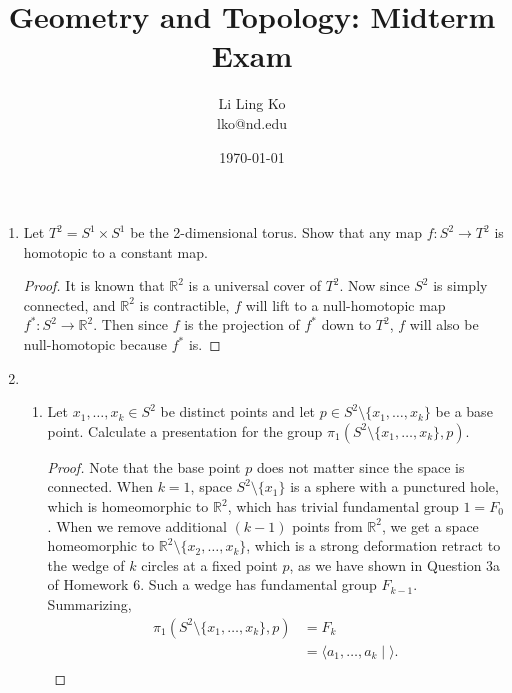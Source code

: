 \documentclass{article}
\begin{document}
\title{Geometry and Topology: Midterm Exam}
\author{Li Ling Ko\\ lko@nd.edu}
\date{\today}
\maketitle

\begin{enumerate}[label={\bf Q\arabic*:}]
  \item Let $T^2=S^1\times S^1$ be the 2-dimensional torus. Show that any
    map $f:S^2\rightarrow T^2$ is homotopic to a constant map.
    \begin{proof}
      It is known that $\mathbb{R}^2$ is a universal cover of $T^2$. Now
      since $S^2$ is simply connected, and $\mathbb{R}^2$ is contractible,
      $f$ will lift to a null-homotopic map
      $f^*:S^2\rightarrow\mathbb{R}^2$. Then since $f$ is the projection of
      $f^*$ down to $T^2$, $f$ will also be null-homotopic because $f^*$
      is.
    \end{proof}

  \item
    \begin{enumerate}
      \item Let $x_1,\ldots,x_k\in S^2$ be distinct points and let $p\in
        S^2\setminus\{x_1,\ldots,x_k\}$ be a base point. Calculate a
        presentation for the group
        $\pi_1(S^2\setminus\{x_1,\ldots,x_k\},p)$.

        \begin{proof}
          Note that the base point $p$ does not matter since the space is
          connected. When $k=1$, space $S^2\setminus\{x_1\}$ is a sphere
          with a punctured hole, which is homeomorphic to $\mathbb{R}^2$,
          which has trivial fundamental group $1=F_0$. When we remove
          additional $(k-1)$ points from $\mathbb{R}^2$, we get a space
          homeomorphic to $\mathbb{R}^2\setminus\{x_2,\ldots,x_k\}$, which
          is a strong deformation retract to the wedge of $k$ circles at a
          fixed point $p$, as we have shown in Question 3a of Homework 6.
          Such a wedge has fundamental group $F_{k-1}$. Summarizing,
          \begin{align*}
            \pi_1(S^2\setminus\{x_1,\ldots,x_k\},p) &=F_k \\
              &=\langle a_1,\ldots,a_k\; |\; \rangle. \\
          \end{align*}
        \end{proof}


\end{enumerate}
\end{enumerate}
\end{document}
